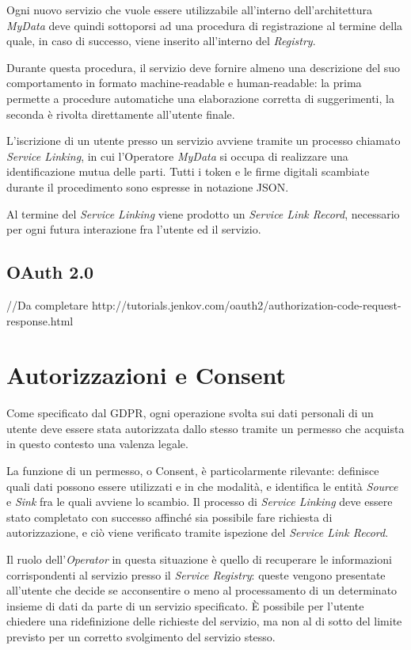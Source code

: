 Ogni nuovo servizio che vuole essere utilizzabile all’interno dell’architettura \textit{MyData} deve quindi sottoporsi ad una procedura di registrazione al termine della quale, in caso di successo, viene inserito all’interno del \textit{Registry}.

Durante questa procedura, il servizio deve fornire almeno una descrizione del suo comportamento in formato machine-readable e human-readable: la prima permette a procedure automatiche una elaborazione corretta di suggerimenti, la seconda \`e rivolta direttamente all’utente finale.

L’iscrizione di un utente presso un servizio avviene tramite un processo chiamato \textit{Service Linking}, in cui l’Operatore \textit{MyData} si occupa di realizzare una identificazione mutua delle parti. Tutti i token e le firme digitali scambiate durante il procedimento sono espresse in notazione JSON.

Al termine del \textit{Service Linking} viene prodotto un \textit{Service Link Record}, necessario per ogni futura interazione fra l’utente ed il servizio.

\subsection{OAuth 2.0}
//Da completare
\cite{oauth}
http://tutorials.jenkov.com/oauth2/authorization-code-request-response.html

\section{Autorizzazioni e Consent}
\label{sec:MD-AuthConsent}
Come specificato dal GDPR, ogni operazione svolta sui dati personali di un utente deve essere stata autorizzata dallo stesso tramite un permesso che acquista in questo contesto una valenza legale.

La funzione di un permesso, o Consent, \`e particolarmente rilevante: definisce quali dati possono essere utilizzati e in che modalit\`a, e identifica le entit\`a \textit{Source} e \textit{Sink} fra le quali avviene lo scambio. Il processo di \textit{Service Linking} deve essere stato completato con successo affinch\'e sia possibile fare richiesta di autorizzazione, e ci\`o viene verificato tramite ispezione del \textit{Service Link Record}.

Il ruolo dell’\textit{Operator} in questa situazione \`e quello di recuperare le informazioni corrispondenti al servizio presso il \textit{Service Registry}: queste vengono presentate all’utente che decide se acconsentire o meno al processamento di un determinato insieme di dati da parte di un servizio specificato. \`E possibile per l’utente chiedere una ridefinizione delle richieste del servizio, ma non al di sotto del limite previsto per un corretto svolgimento del servizio stesso.

